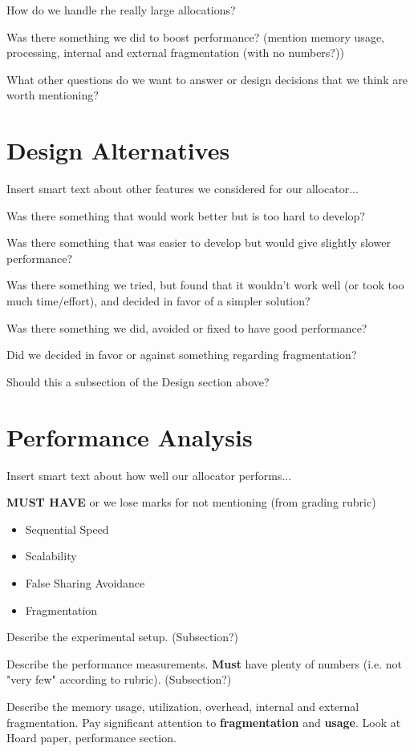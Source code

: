 \documentclass{article}
\begin{document}
How do we handle rhe really large allocations?

Was there something we did to boost performance? (mention memory usage, 
processing, internal and external fragmentation (with no numbers?))

What other questions do we want to answer or design decisions that we think
are worth mentioning?

\newpage
\section{Design Alternatives}

Insert smart text about other features we considered for our allocator...

Was there something that would work better but is too hard to develop?

Was there something that was easier to develop but would give slightly slower
performance?

Was there something we tried, but found that it wouldn't work well (or took too 
much time/effort), and decided in favor of a simpler solution?

Was there something we did, avoided or fixed to have good performance?

Did we decided in favor or against something regarding fragmentation?

Should this a subsection of the Design section above?

\newpage
\section{Performance Analysis}

Insert smart text about how well our allocator performs...

\textbf{MUST HAVE} or we lose marks for not mentioning (from grading rubric)
\begin{itemize}
	\item Sequential Speed
	\item Scalability
	\item False Sharing Avoidance
	\item Fragmentation
\end{itemize}

Describe the experimental setup. (Subsection?)

Describe the performance measurements. \textbf{Must} have plenty of numbers 
(i.e. not "very few" according to rubric). (Subsection?)

Describe the memory usage, utilization, overhead, internal and external 
fragmentation. Pay significant attention to \textbf{fragmentation} and 
\textbf{usage}. Look at Hoard paper, performance section. 
\end{document}
